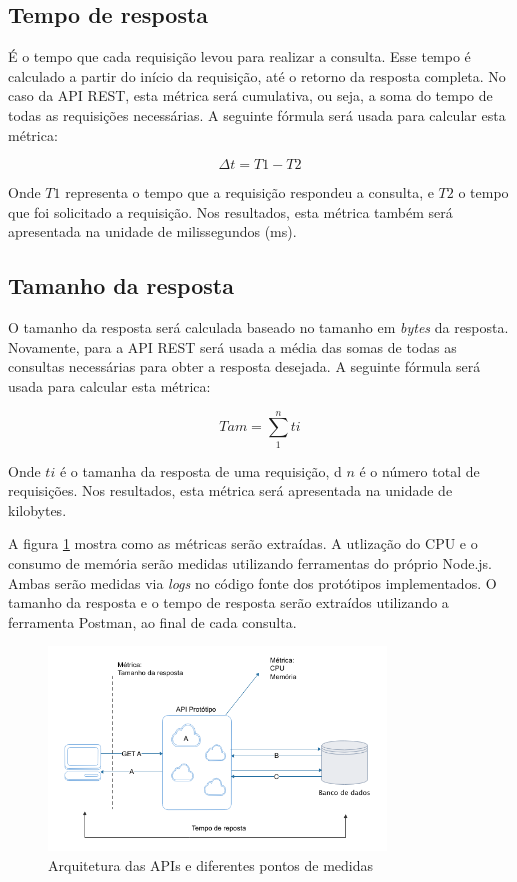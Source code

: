 \subsection*{Tempo de resposta}

É o tempo que cada requisição levou para realizar a consulta. Esse tempo é calculado a partir do início da requisição, até o retorno da resposta completa. No caso da API REST, esta métrica será cumulativa, ou seja, a soma do tempo de todas as requisições necessárias. A seguinte fórmula será usada para calcular esta métrica: 

$$ \Delta t = T1 - T2 $$

Onde $T1$ representa o tempo que a requisição respondeu a consulta, e $T2$ o tempo que foi solicitado a requisição. Nos resultados, esta métrica também será apresentada na unidade de milissegundos (ms).

\subsection*{Tamanho da resposta}

O tamanho da resposta será calculada baseado no tamanho em \textit{bytes} da resposta. Novamente, para a API REST será usada a média das somas de todas as consultas necessárias para obter a resposta desejada. A seguinte fórmula será usada para calcular esta métrica: 

$$ Tam = \sum\limits_{1}^{n} ti $$

Onde $ti$ é o tamanha da resposta de uma requisição, d $n$ é o número total de requisições. Nos resultados, esta métrica será apresentada na unidade de kilobytes.

A figura \ref{fig:my-metrics} mostra como as métricas serão extraídas. A utlização do CPU e o consumo de memória serão medidas utilizando ferramentas do próprio Node.js. Ambas serão medidas via \textit{logs} no código fonte dos protótipos implementados. O tamanho da resposta e o tempo de resposta serão extraídos utilizando a ferramenta Postman, ao final de cada consulta.

\begin{figure}[htbp]
\centering
\includegraphics[width=0.8\textwidth]{figuras/metricas.png}
\caption{Arquitetura das APIs e diferentes pontos de medidas}
\label{fig:my-metrics}
\author{fonte: Autor}
\end{figure}

